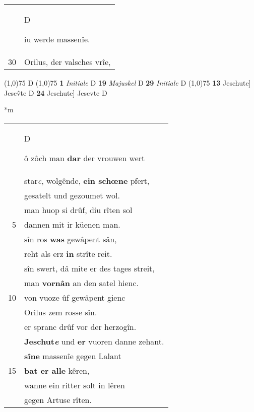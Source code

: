 \documentclass[8pt,a4paper,notitlepage]{article}
\begin{document}
\begin{table}[ht]
\begin{minipage}[t]{0.5\linewidth}
\begin{tabular}{rl}
 & \begin{large}D\end{large}iu werde massenîe.\\ 
30 & Orilus, der valsches vrîe,\\ 
\end{tabular}
\scriptsize
\line(1,0){75} \newline
D \newline
\line(1,0){75} \newline
\textbf{1} \textit{Initiale} D  \textbf{19} \textit{Majuskel} D  \textbf{29} \textit{Initiale} D  \newline
\line(1,0){75} \newline
\textbf{13} Jeschute] Jescv̂te D \textbf{24} Jeschute] Jescvte D \newline
\end{minipage}
\hspace{0.5cm}
\begin{minipage}[t]{0.5\linewidth}
\small
\begin{center}*m
\end{center}
\begin{tabular}{rl}
 & \begin{large}D\end{large}ô zôch man \textbf{dar} der vrouwen wert\\ 
 & star\textit{c}, wolgênde, \textbf{ein schœne} pfert,\\ 
 & gesatelt und gezoumet wol.\\ 
 & man huop si drûf, diu rîten sol\\ 
5 & dannen mit ir küenen man.\\ 
 & sîn ros \textbf{was} gewâpent sân,\\ 
 & reht als erz \textbf{in} strîte reit.\\ 
 & sîn swert, dâ mite er des tages streit,\\ 
 & man \textbf{vornân} an den satel hienc.\\ 
10 & von vuoze ûf gewâpent gienc\\ 
 & Orilus zem rosse sîn.\\ 
 & er spranc drûf vor der herzogîn.\\ 
 & \textbf{Jeschut\textit{e}} und \textbf{er} vuoren danne zehant.\\ 
 & \textbf{sîne} massenîe gegen Lalant\\ 
15 & \textbf{bat er alle} kêren,\\ 
 & wanne ein ritter solt in lêren\\ 
 & gegen Artuse rîten.\\ 

\end{tabular}
\end{minipage}
\end{table}
\end{document}
